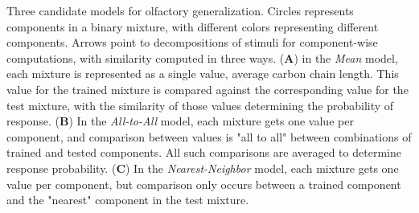 \label{fig:cartoon}
Three candidate models for olfactory generalization.  Circles represents components in a binary mixture, with different colors representing different components.  Arrows point to decompositions of stimuli for component-wise computations, with similarity computed in three ways. (\textbf{A}) in the \textit{Mean} model, each mixture is represented as a single value, average carbon chain length.  This value for the trained mixture is compared against the corresponding value for the test mixture, with the similarity of those values determining the probability of response. (\textbf{B}) In the \textit{All-to-All} model, each mixture gets one value per component, and comparison between values is "all to all" between combinations of trained and tested components.  All such comparisons are averaged to determine response probability. (\textbf{C}) In the \textit{Nearest-Neighbor} model, each mixture gets one value per component, but comparison only occurs between a trained component and the "nearest" component in the test mixture.  